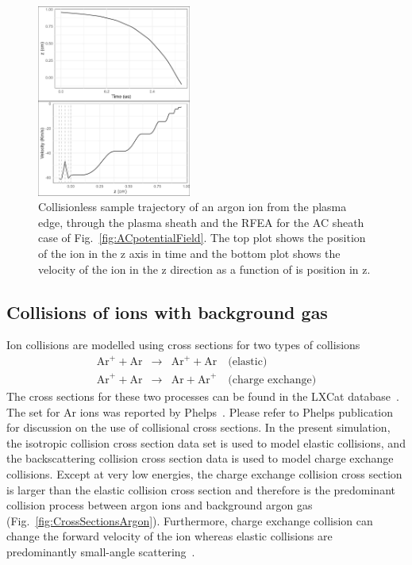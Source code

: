 \begin{figure}[htbp]
\centering
\includegraphics[width=0.45\textwidth]{Figures/ionTrajectory0.5Pa13.56MHz2kVStack2332_Collisionless.jpeg}
\caption{Collisionless sample trajectory of an argon ion from the plasma edge, through the plasma sheath and the RFEA for the AC sheath case of Fig.~\ref{fig:ACpotentialField}. The top plot shows the position of the ion in the z axis in time and the bottom plot shows the velocity of the ion in the z direction as a function of is position in z. }
\label{fig:CollisionlessACtrajectory}
\end{figure}



\subsection{\label{IonCollision}Collisions of ions with background gas}
Ion collisions are modelled using cross sections for two types of collisions
\begin{eqnarray}
\text{Ar}^+ + \text{Ar} &\rightarrow& \text{Ar}^+ + \text{Ar} \quad \text{(elastic)} \\
\text{Ar}^+ + \text{Ar} &\rightarrow& \text{Ar} + \text{Ar}^+ \quad \text{(charge exchange)} 
\end{eqnarray}
The cross sections for these two processes can be found in the LXCat database~\cite{LXCat}. The set for Ar ions was reported by Phelps~\cite{Phelps1994}. Please refer to Phelps publication for discussion on the use of collisional cross sections. In the present simulation, the isotropic collision cross section data set is used to model elastic collisions, and the backscattering collision cross section data is used to model charge exchange collisions. Except at very low energies, the charge exchange collision cross section is larger than the elastic collision cross section and therefore is the predominant collision process between argon ions and background argon gas (Fig.~\ref{fig:CrossSectionsArgon}). Furthermore, charge exchange collision can change the forward velocity of the ion whereas elastic collisions are predominantly small-angle scattering~\cite{Davis1963}.

